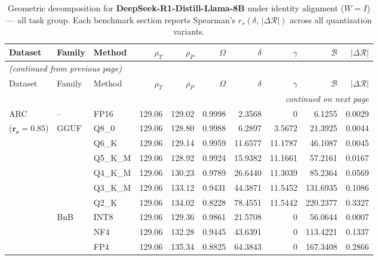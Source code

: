 \begingroup
\small
\setlength{\tabcolsep}{4pt}
\renewcommand{\arraystretch}{1.05}
\setlength{\LTcapwidth}{\textwidth}
\begin{longtable}{ll l rrrrrrr}
\caption{Geometric decomposition for \textbf{DeepSeek-R1-Distill-Llama-8B} under identity alignment ($W{=}I$) --- all task group. Each benchmark section reports Spearman's $r_s(\delta,\,|\Delta\mathcal{R}|)$ across all quantization variants.}\label{tab:deepseek_decomposition_all}\\
\toprule
Dataset & Family & Method & $\rho_T$ & $\rho_P$ & $\Omega$ & $\delta$ & $\gamma$ & $\mathcal{B}$ & $|\Delta\mathcal{R}|$ \\
\midrule
\endfirsthead
\multicolumn{10}{l}{\small\itshape (continued from previous page)}\\
\toprule
Dataset & Family & Method & $\rho_T$ & $\rho_P$ & $\Omega$ & $\delta$ & $\gamma$ & $\mathcal{B}$ & $|\Delta\mathcal{R}|$ \\
\midrule
\endhead
\midrule
\multicolumn{10}{r}{\small\itshape continued on next page}\\
\endfoot
\bottomrule
\endlastfoot
ARC & -- & FP16 & 129.06 & 129.02 & 0.9998 & 2.3568 & \cellcolor{cyan!12} $0$ & 6.1255 & 0.0029 \\
{\small ($\mathbf{r_s{=}0.85}$)} & GGUF & Q8\_0 & 129.06 & 128.80 & 0.9988 & 6.2897 & 3.5672 & 21.3925 & 0.0044 \\
 &  & Q6\_K & 129.06 & 129.14 & 0.9959 & 11.6577 & 11.1787 & 46.1087 & 0.0045 \\
 &  & Q5\_K\_M & 129.06 & 128.92 & 0.9924 & 15.9382 & 11.1661 & 57.2161 & 0.0167 \\
 &  & Q4\_K\_M & 129.06 & 130.23 & 0.9789 & 26.6440 & 11.3039 & 85.2364 & 0.0569 \\
 &  & Q3\_K\_M & 129.06 & 133.12 & \cellcolor{red!18} 0.9431 & \cellcolor{red!18} 44.3871 & 11.5452 & \cellcolor{red!18} 131.6935 & \cellcolor{red!18} 0.1086 \\
 &  & Q2\_K & 129.06 & 134.02 & \cellcolor{red!18} 0.8228 & \cellcolor{red!18} 78.4551 & 11.5442 & \cellcolor{red!18} 220.2377 & \cellcolor{red!18} 0.3327 \\
 & BnB & INT8 & 129.06 & 129.36 & 0.9861 & 21.5708 & \cellcolor{cyan!12} $0$ & 56.0644 & 0.0007 \\
 &  & NF4 & 129.06 & 132.28 & \cellcolor{red!18} 0.9445 & \cellcolor{red!18} 43.6391 & \cellcolor{cyan!12} $0$ & \cellcolor{red!18} 113.4221 & \cellcolor{red!18} 0.1337 \\
 &  & FP4 & 129.06 & 135.34 & \cellcolor{red!18} 0.8825 & \cellcolor{red!18} 64.3843 & \cellcolor{cyan!12} $0$ & \cellcolor{red!18} 167.3408 & \cellcolor{red!18} 0.2866 \\

\end{longtable}
